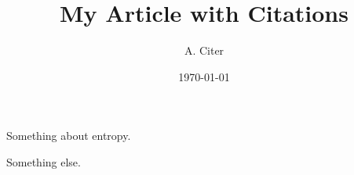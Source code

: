 \documentclass{article}
\begin{document}
\title{My Article with Citations}
\author{A. Citer}
\date{\today}
\maketitle

Something about entropy\cite{coifman92}. 

Something else\cite{keller03}.

{}

\end{document}
